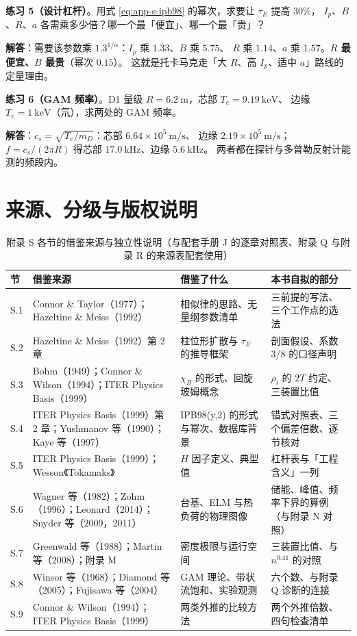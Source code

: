\textbf{练习 5（设计杠杆）}。用式 \eqref{eq:app-s-ipb98} 的幂次，求要让 $\tau_E$ 提高 $30\%$，
$I_p$、$B$、$R$、$a$ 各需乘多少倍？哪一个最「便宜」、哪一个最「贵」？

\textbf{解答}：需要该参数乘 $1.3^{1/\alpha}$：$I_p$ 乘 $1.33$、$B$ 乘 $5.75$、
$R$ 乘 $1.14$、$a$ 乘 $1.57$。\textbf{$R$ 最便宜、$B$ 最贵}（幂次 $0.15$）。
这就是托卡马克走「大 $R$、高 $I_p$、适中 $a$」路线的定量理由。

\textbf{练习 6（GAM 频率）}。D1 量级 $R=6.2\ \mathrm{m}$，芯部 $T_e=9.19\ \mathrm{keV}$、
边缘 $T_e=1\ \mathrm{keV}$（氘），求两处的 GAM 频率。

\textbf{解答}：$c_s=\sqrt{T_e/m_D}$：芯部 $6.64\times10^5\ \mathrm{m/s}$、
边缘 $2.19\times10^5\ \mathrm{m/s}$；
$f=c_s/(2\pi R)$ 得芯部 $17.0\ \mathrm{kHz}$、边缘 $5.6\ \mathrm{kHz}$。
两者都在探针与多普勒反射计能测的频段内。


\section{来源、分级与版权说明}
\label{sec:app-s-source}

\begingroup\small
\begin{table}[htbp]
  \centering
  \caption{附录 S 各节的借鉴来源与独立性说明（与配套手册 J 的逐章对照表、附录 Q 与附录 R 的来源表配套使用）}
  \label{tab:app-s-source}
  \begin{tabular}{@{}p{1.2cm}p{6.4cm}p{4.6cm}p{4.2cm}@{}}
    \toprule
    节 & 借鉴来源 & 借鉴了什么 & 本书自拟的部分 \\
    \midrule
    S.1 & Connor \& Taylor（1977）；Hazeltine \& Meiss（1992） & 相似律的思路、无量纲参数清单 & 三前提的写法、三个工作点的选法 \\
    S.2 & Hazeltine \& Meiss（1992）第 2 章 & 柱位形扩散与 $\tau_E$ 的推导框架 & 剖面假设、系数 $3/8$ 的口径声明 \\
    S.3 & Bohm（1949）；Connor \& Wilson（1994）；ITER Physics Basis（1999） & $\chi_B$ 的形式、回旋玻姆概念 & $\rho_i$ 的 $2T$ 约定、三装置比值 \\
    S.4 & ITER Physics Basis（1999）第 2 章；Yushmanov 等（1990）；Kaye 等（1997） & IPB98(y,2) 的形式与幂次、数据库背景 & 错式对照表、三个偏差倍数、逐节核对 \\
    S.5 & ITER Physics Basis（1999）；Wesson《Tokamaks》 & $H$ 因子定义、典型值 & 杠杆表与「工程含义」一列 \\
    S.6 & Wagner 等（1982）；Zohm（1996）；Leonard（2014）；Snyder 等（2009，2011） & 台基、ELM 与热负荷的物理图像 & 储能、峰值、频率下界的算例（与附录 N 对照）\\
    S.7 & Greenwald 等（1988）；Martin 等（2008）；附录 M & 密度极限与运行空间 & 三装置比值、与 $n^{0.41}$ 的对照 \\
    S.8 & Winsor 等（1968）；Diamond 等（2005）；Fujisawa 等（2004） & GAM 理论、带状流饱和、实验观测 & 六个数、与附录 Q 诊断的连接 \\
    S.9 & Connor \& Wilson（1994）；ITER Physics Basis（1999） & 两类外推的比较方法 & 两个外推倍数、四句检查清单 \\
    \bottomrule
  \end{tabular}
\end{table}

